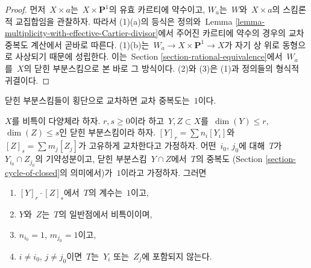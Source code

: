 \begin{proof}
먼저\  $X \times a$는\  $X \times \mathbf{P}^1$의 유효 카르티에 약수이고,
$W_a$는\  $W$와\  $X \times a$의 스킴론적 교집합임을 관찰하자.
따라서 (1)(a)의 등식은 정의와\ 
Lemma \ref{lemma-multiplicity-with-effective-Cartier-divisor}에서 주어진
카르티에 약수의 경우의 교차 중복도 계산에서 곧바로 따른다.
(1)(b)는\  $W_a \to X \times \mathbf{P}^1 \to X$가 자기 상 위로 동형으로
사상되기 때문에 성립한다. 이는\  Section \ref{section-rational-equivalence}에서\ 
$W_a$를\  $X$의 닫힌 부분스킴으로 본 바로 그 방식이다.
(2)와 (3)은 (1)과 정의들의 형식적 귀결이다.
\end{proof}

\noindent
닫힌 부분스킴들이 횡단으로 교차하면 교차 중복도는\  $1$이다.

\begin{lemma}
\label{lemma-transversal-subschemes}
$X$를 비특이 다양체라 하자. $r, s \geq 0$이라 하고\ 
$Y, Z \subset X$를\  $\dim(Y) \leq r$, $\dim(Z) \leq s$인 닫힌
부분스킴이라 하자. $[Y]_r = \sum n_i[Y_i]$와\ 
$[Z]_s = \sum m_j[Z_j]$가 고유하게 교차한다고 가정하자.
어떤\  $i_0$, $j_0$에 대해\  $T$가\  $Y_{i_0} \cap Z_{j_0}$의 기약성분이고,
닫힌 부분스킴\  $Y \cap Z$에서\  $T$의 중복도
(Section \ref{section-cycle-of-closed}의 의미에서)가\  $1$이라고 가정하자.
그러면
\begin{enumerate}
\item $[Y]_r \cdot [Z]_s$에서\  $T$의 계수는\  $1$이고,
\item $Y$와\  $Z$는\  $T$의 일반점에서 비특이이며,
\item $n_{i_0} = 1$, $m_{j_0} = 1$이고,
\item $i \not = i_0$, $j \not = j_0$이면\  $T$는\  $Y_i$ 또는\  $Z_j$에
포함되지 않는다.
\end{enumerate}
\end{lemma}

